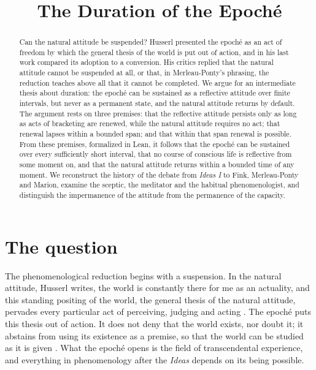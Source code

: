 \documentclass{situationist-preprint}
\title{The Duration of the Epoché}
\begin{document}
\maketitle

\begin{abstract}
Can the natural attitude be suspended? Husserl presented the epoché as an act of freedom by which the general thesis of the world is put out of action, and in his last work compared its adoption to a conversion. His critics replied that the natural attitude cannot be suspended at all, or that, in Merleau-Ponty's phrasing, the reduction teaches above all that it cannot be completed. We argue for an intermediate thesis about duration: the epoché can be sustained as a reflective attitude over finite intervals, but never as a permanent state, and the natural attitude returns by default. The argument rests on three premises: that the reflective attitude persists only as long as acts of bracketing are renewed, while the natural attitude requires no act; that renewal lapses within a bounded span; and that within that span renewal is possible. From these premises, formalized in Lean, it follows that the epoché can be sustained over every sufficiently short interval, that no course of conscious life is reflective from some moment on, and that the natural attitude returns within a bounded time of any moment. We reconstruct the history of the debate from \emph{Ideas I} to Fink, Merleau-Ponty and Marion, examine the sceptic, the meditator and the habitual phenomenologist, and distinguish the impermanence of the attitude from the permanence of the capacity.
\end{abstract}

\section{The question}

The phenomenological reduction begins with a suspension. In the natural attitude, Husserl writes, the world is constantly there for me as an actuality, and this standing positing of the world, the general thesis of the natural attitude, pervades every particular act of perceiving, judging and acting \citep[§§27--30]{Husserl1913}. The epoché puts this thesis out of action. It does not deny that the world exists, nor doubt it; it abstains from using its existence as a premise, so that the world can be studied as it is given \citep[§§31--32]{Husserl1913}. What the epoché opens is the field of transcendental experience, and everything in phenomenology after the \emph{Ideas} depends on its being possible.
\end{document}
